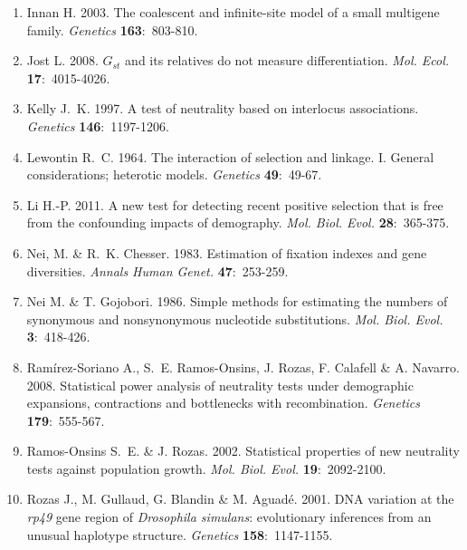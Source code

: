\documentclass{scrartcl}
\begin{document}
\begin{flushleft}
\begin{enumerate}[leftmargin=!,labelindent=5pt,itemindent=-15pt]
    \item[] Innan H. 2003. The coalescent and infinite-site model of a
        small multigene family. \textit{Genetics} \textbf{163}:~803-810.

    \item[] Jost L. 2008. $G_{st}$ and its relatives do not measure
        differentiation. \textit{Mol. Ecol.} \textbf{17}:~4015-4026.

    \item[] Kelly J.~K. 1997. A test of neutrality based on interlocus
        associations. \textit{Genetics} \textbf{146}:~1197-1206.

    \item[] Lewontin R.~C. 1964. The interaction of selection and
        linkage. I. General considerations; heterotic models.
        \textit{Genetics} \textbf{49}:~49-67.

    \item[] Li H.-P. 2011. A new test for detecting recent positive
        selection that is free from the confounding impacts of
        demography. \textit{Mol. Biol. Evol.} \textbf{28}:~365-375.

    \item[] Nei, M. \& R.~K. Chesser. 1983. Estimation of fixation
        indexes and gene diversities. \textit{Annals Human Genet.}
        \textbf{47}:~253-259.

    \item[] Nei M. \& T. Gojobori. 1986. Simple methods for estimating
        the numbers of synonymous and nonsynonymous nucleotide
        substitutions. \textit{Mol. Biol. Evol.} \textbf{3}:~418-426.

    \item[] Ram\'irez-Soriano A., S.~E. Ramos-Onsins, J. Rozas, F.
        Calafell \& A. Navarro. 2008. Statistical power analysis of
        neutrality tests under demographic expansions, contractions and
        bottlenecks with recombination. \textit{Genetics}
        \textbf{179}:~555-567.

    \item[] Ramos-Onsins S.~E. \& J. Rozas. 2002. Statistical
        properties of new neutrality tests against population growth.
        \textit{Mol. Biol. Evol.} \textbf{19}:~2092-2100.

    \item[] Rozas J., M. Gullaud, G. Blandin \& M. Aguad\'e. 2001. DNA
        variation at the \textit{rp49} gene region of \textit{Drosophila
        simulans}: evolutionary inferences from an unusual haplotype
        structure. \textit{Genetics} \textbf{158}:~1147-1155.


\end{enumerate}
\end{flushleft}
\end{document}
